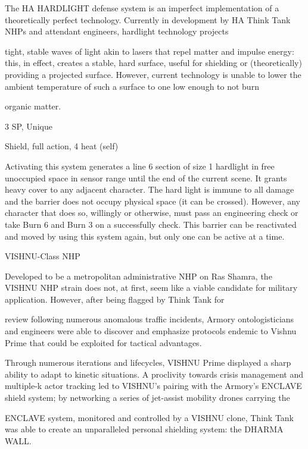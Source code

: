 The HA HARDLIGHT defense system is an imperfect implementation of a theoretically perfect technology.  
Currently in development by HA Think Tank NHPs and attendant engineers, hardlight technology projects  

tight, stable waves of light akin to lasers that repel matter and impulse energy: this, in effect, creates a  
stable, hard surface, useful for shielding or (theoretically) providing a projected surface. However, current  
technology is unable to lower the ambient temperature of such a surface to one low enough to not burn  

organic matter.  

3 SP, Unique  

Shield, full action, 4 heat (self)
 
Activating this system generates a line 6 section of size 1 hardlight in free unoccupied space in  
sensor range until the end of the current scene. It grants heavy cover to any adjacent character.  
The hard light is immune to all damage and the barrier does not occupy physical space (it can be  
crossed). However, any character that does so, willingly or otherwise, must pass an engineering  
check or take Burn 6 and Burn 3 on a successfully check. This barrier can be reactivated and  
moved by using this system again, but only one can be active at a time.
 

VISHNU-Class NHP  

Developed to be a metropolitan administrative NHP on Ras Shamra, the VISHNU NHP strain does not, at  
first, seem like a viable candidate for military application. However, after being flagged by Think Tank for  

review following numerous anomalous traffic incidents, Armory ontologisticians and engineers were able to  
discover and emphasize protocols endemic to Vishnu Prime that could be exploited for tactical advantages.   

                                                                                                                      


Through numerous iterations and lifecycles, VISHNU Prime displayed a sharp ability to adapt to kinetic  
situations. A proclivity towards crisis management and multiple-k actor tracking led to VISHNU’s pairing  
with the Armory’s ENCLAVE shield system; by networking a series of jet-assist mobility drones carrying the  

ENCLAVE system, monitored and controlled by a VISHNU clone, Think Tank was able to create an  
unparalleled personal shielding system: the DHARMA WALL.  
 

